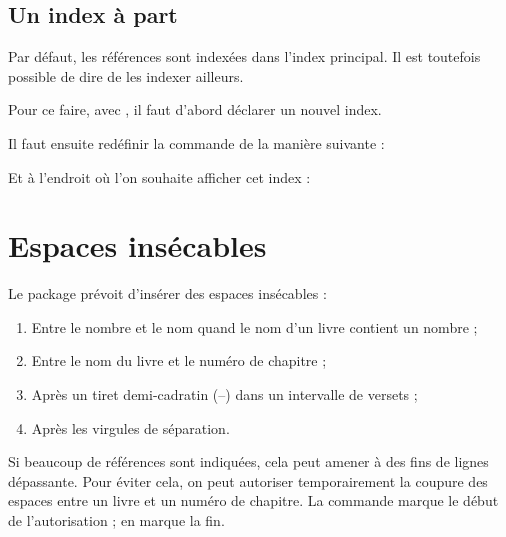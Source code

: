\subsection{Un index à part}

Par défaut, les références sont indexées dans l'index principal. Il est toutefois possible de dire de les indexer ailleurs.

Pour ce faire, avec , il faut d'abord déclarer un nouvel index.

\begin{latexcode}
\end{latexcode}

Il faut ensuite redéfinir la commande  de la manière suivante :

\begin{latexcode}
\renewcommand{\biblerefindex}[0]{\sindex[sources]}
\end{latexcode}

Et à l'endroit où l'on souhaite afficher cet index :

\begin{latexcode}
\printindex[bible]
\end{latexcode}

\section{Espaces insécables}

Le package  prévoit d'insérer des espaces insécables :
\begin{enumerate}
\item Entre le nombre et le nom quand le nom d’un livre contient un nombre ;
\item Entre le nom du livre et le numéro de chapitre ;
\item Après un tiret demi-cadratin (–) dans un intervalle de versets ; 
\item Après les virgules de séparation.
\end{enumerate}

Si beaucoup de références sont indiquées, cela peut amener à des fins de lignes dépassante.
Pour éviter cela, on peut autoriser temporairement la coupure des espaces entre un livre et un numéro de chapitre. La commande  marque le début de l'autorisation ;  en marque la fin.


